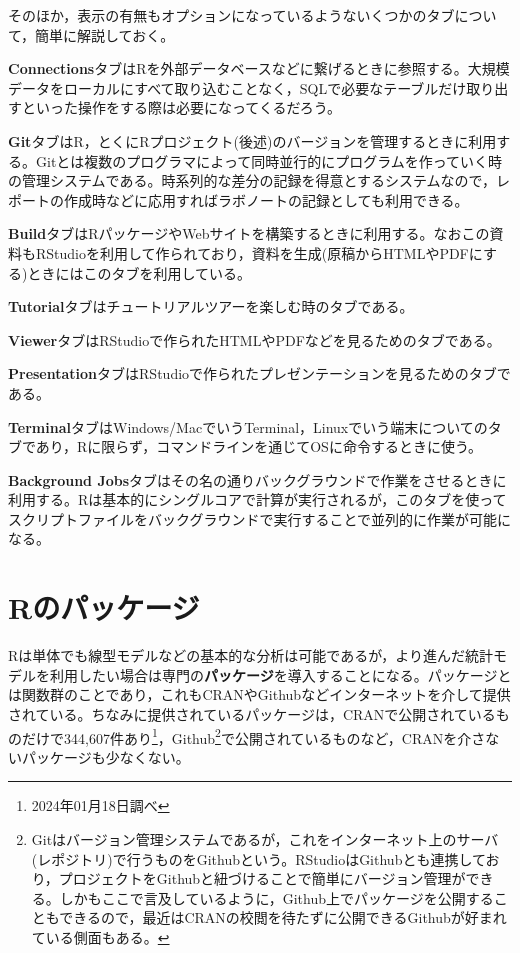 \documentclass[
  a4paper,
]{ltjsbook}
\begin{document}
そのほか，表示の有無もオプションになっているようないくつかのタブについて，簡単に解説しておく。

\textbf{Connections}タブはRを外部データベースなどに繋げるときに参照する。大規模データをローカルにすべて取り込むことなく，SQLで必要なテーブルだけ取り出すといった操作をする際は必要になってくるだろう。

\textbf{Git}タブはR，とくにRプロジェクト(後述)のバージョンを管理するときに利用する。Gitとは複数のプログラマによって同時並行的にプログラムを作っていく時の管理システムである。時系列的な差分の記録を得意とするシステムなので，レポートの作成時などに応用すればラボノートの記録としても利用できる。

\textbf{Build}タブはRパッケージやWebサイトを構築するときに利用する。なおこの資料もRStudioを利用して作られており，資料を生成(原稿からHTMLやPDFにする)ときにはこのタブを利用している。

\textbf{Tutorial}タブはチュートリアルツアーを楽しむ時のタブである。

\textbf{Viewer}タブはRStudioで作られたHTMLやPDFなどを見るためのタブである。

\textbf{Presentation}タブはRStudioで作られたプレゼンテーションを見るためのタブである。

\textbf{Terminal}タブはWindows/MacでいうTerminal，Linuxでいう端末についてのタブであり，Rに限らず，コマンドラインを通じてOSに命令するときに使う。

\textbf{Background
Jobs}タブはその名の通りバックグラウンドで作業をさせるときに利用する。Rは基本的にシングルコアで計算が実行されるが，このタブを使ってスクリプトファイルをバックグラウンドで実行することで並列的に作業が可能になる。

\hypertarget{rux306eux30d1ux30c3ux30b1ux30fcux30b8-1}{%
\section{Rのパッケージ}\label{rux306eux30d1ux30c3ux30b1ux30fcux30b8-1}}

Rは単体でも線型モデルなどの基本的な分析は可能であるが，より進んだ統計モデルを利用したい場合は専門の\textbf{パッケージ}を導入することになる。パッケージとは関数群のことであり，これもCRANやGithubなどインターネットを介して提供されている。ちなみに提供されているパッケージは，CRANで公開されているものだけで344,607件あり\footnote{2024年01月18日調べ}，Github\footnote{Gitはバージョン管理システムであるが，これをインターネット上のサーバ(レポジトリ)で行うものをGithubという。RStudioはGithubとも連携しており，プロジェクトをGithubと紐づけることで簡単にバージョン管理ができる。しかもここで言及しているように，Github上でパッケージを公開することもできるので，最近はCRANの校閲を待たずに公開できるGithubが好まれている側面もある。}で公開されているものなど，CRANを介さないパッケージも少なくない。
\end{document}
